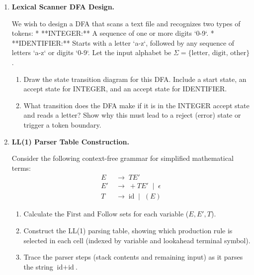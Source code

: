 \documentclass[12pt, a4paper]{book}
\begin{document}
\begin{problembox}
\begin{enumerate}[label=\textbf{P\arabic*.}]
  \item \textbf{Lexical Scanner DFA Design.}
  
        We wish to design a DFA that scans a text file and recognizes two types of tokens:
        * **INTEGER:** A sequence of one or more digits `0-9`.
        * **IDENTIFIER:** Starts with a letter `a-z`, followed by any sequence of letters `a-z` or digits `0-9`.
        Let the input alphabet be $\Sigma = \{ \text{letter, digit, other} \}$.
        \begin{enumerate}[label=(\alph*)]
          \item Draw the state transition diagram for this DFA. Include a start state, an accept state for INTEGER, and an accept state for IDENTIFIER.
          \item What transition does the DFA make if it is in the INTEGER accept state and reads a letter? Show why this must lead to a reject (error) state or trigger a token boundary.
        \end{enumerate}

  \item \textbf{LL(1) Parser Table Construction.}
  
        Consider the following context-free grammar for simplified mathematical terms:
        \[
          \begin{aligned}
            E  &\;\to\; T E' \\
            E' &\;\to\; + T E' \;\mid\; \epsilon \\
            T  &\;\to\; \text{id} \;\mid\; ( E )
          \end{aligned}
        \]
        \begin{enumerate}[label=(\alph*)]
          \item Calculate the $\text{First}$ and $\text{Follow}$ sets for each variable ($E, E', T$).
          \item Construct the LL(1) parsing table, showing which production rule is selected in each cell (indexed by variable and lookahead terminal symbol).
          \item Trace the parser steps (stack contents and remaining input) as it parses the string $\text{id} + \text{id}$.
        \end{enumerate}
\end{enumerate}
\end{problembox}
\end{document}
